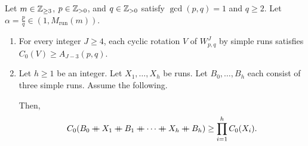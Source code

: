 \begin{lemma}\label{lem:separated-subwords}
Let $m\in\mathbb Z_{\ge3}$, $p\in\mathbb Z_{>0}$, and $q\in\mathbb Z_{>0}$ satisfy $\gcd(p,q)=1$ and $q\ge2$.
Let $\alpha=\frac pq\in(1,M_{\mathrm{run}}(m))$.

\begin{enumerate}
\item\label{c:separated-subwords-rotations} For every integer $J\ge4$, each cyclic rotation $V$ of $W_{p,q}^J$
by simple runs satisfies $C_0(V)\ge A_{J-3}(p,q)$.
\item\label{c:separated-subwords-construction} Let $h\ge1$ be an integer.
Let $X_1,\ldots,X_h$ be runs.
Let $B_0,\ldots,B_h$ each consist of three simple runs. Assume the following.
Then,
\begin{equation}\label{eq:separated-subwords}
 C_0(B_0\ccn X_1\ccn B_1\ccn \cdots\ccn X_h\ccn B_h)\ge\prod_{i=1}^h C_0(X_i).
\end{equation}
\end{enumerate}
\end{lemma}
